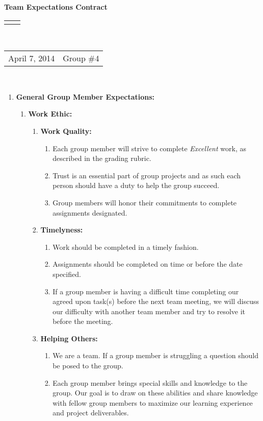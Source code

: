 \documentclass[12pt]{article}
\renewcommand{\title}[1]{\textbf{#1}\\}
\renewcommand{\line}{\begin{tabularx}{\textwidth}{X>{\raggedleft}X}\hline\\\end{tabularx}\\[-0.5cm]}
\newcommand{\leftright}[2]{\begin{tabularx}{\textwidth}{X>{\raggedleft}X}#1%
& #2\\\end{tabularx}\\[-0.5cm]}
\begin{document}
\title{Team Expectations Contract }
\line
\leftright{April 7, 2014}{Group \#4} %
\vspace{5mm}

\begin{enumerate}
\item \textbf{General Group Member Expectations:} 
\begin{enumerate}
\item \textbf{Work Ethic:}
\begin{enumerate}
\item \textbf{Work Quality: }
\begin{enumerate}
\item  Each group member will strive to complete \emph{Excellent} work, as described in the grading rubric. 
\item Trust is an essential part of group projects and as such each person should have a duty to help the group succeed. 
\item Group members will honor their commitments to complete assignments designated. 
\end{enumerate}
\item \textbf{Timelyness: }
\begin{enumerate}
\item Work should be completed in a timely fashion.
\item Assignments should be completed on time or before the date specified. 
\item If a group member is having a difficult time completing our agreed upon task(s) before the next team meeting, we will discuss our difficulty with another team member and try to resolve it before the meeting. 
\end{enumerate}
\item \textbf{Helping Others: }
\begin{enumerate}
\item We are a team.  If a group member is struggling a question should be posed to the group.  
\item Each group member brings special skills and knowledge to the group.  Our goal is to draw on these abilities and share knowledge with fellow group members to maximize our learning experience and project deliverables. 
\end{enumerate}
\end{enumerate}


\end{enumerate}
\end{enumerate}
\end{document}
